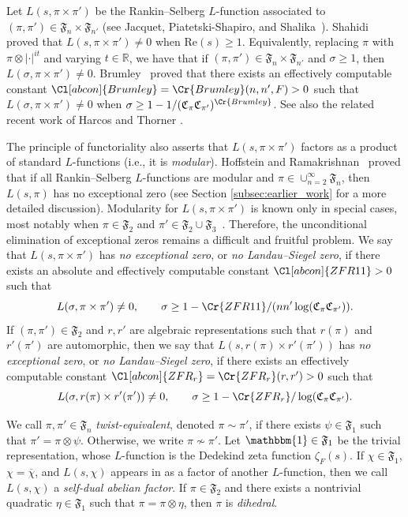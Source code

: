 \documentclass[11pt]{amsart}
\theoremstyle{remark}
\renewcommand{\bar}{\overline}
\numberwithin{equation}{section}
\begin{document}
Let $L(s,\pi\times\pi')$ be the Rankin--Selberg $L$-function associated to $(\pi,\pi')\in\mathfrak{F}_{n}\times\mathfrak{F}_{n'}$ (see Jacquet, Piatetski-Shapiro, and Shalika~\cite{JPSS}).  Shahidi~\cite{Shahidi} proved that $L(s,\pi\times\pi')\neq 0$ when $\mathrm{Re}(s)\geq 1$.  Equivalently, replacing $\pi$ with $\pi\otimes|\cdot|^{it}$ and varying $t\in\mathbb{R}$, we have that if $(\pi,\pi')\in\mathfrak{F}_{n}\times\mathfrak{F}_{n'}$ and $\sigma\geq 1$, then $L(\sigma,\pi\times\pi')\neq 0$.  Brumley~\cite{Brumley,Lapid} proved that there exists an effectively computable constant $\Cl[abcon]{Brumley}=\Cr{Brumley}(n,n',F)>0$ such that $L(\sigma,\pi\times\pi')\neq 0$ when $\sigma\geq 1-1/(\mathfrak{C}_{\pi}\mathfrak{C}_{\pi'})^{\Cr{Brumley}}$.  See also the related recent work of Harcos and Thorner \cite{HarcosThorner,HarcosThorner2}.

The principle of functoriality also asserts that $L(s,\pi\times\pi')$ factors as a product of standard $L$-functions (i.e., it is {\it modular}).  Hoffstein and Ramakrishnan~\cite{HoffsteinRamakrishnan} proved that if all Rankin--Selberg $L$-functions are modular and $\pi \in \cup_{n=2}^{\infty}\mathfrak{F}_{n}$, then $L(s,\pi)$ has no exceptional zero (see Section \ref{subsec:earlier_work} for a more detailed discussion).  Modularity for $L(s,\pi\times\pi')$ is known only in special cases, most notably when $\pi\in\mathfrak{F}_{2}$ and $\pi'\in\mathfrak{F}_{2}\cup\mathfrak{F}_{3}$~\cite{KimShahidi,Ramakrishnan}. Therefore, the unconditional elimination of exceptional zeros remains a difficult and fruitful problem.  We say that $L(s,\pi\times\pi')$ has {\it no exceptional zero}, or {\it no Landau--Siegel zero}, if there exists an absolute and effectively computable constant $\Cl[abcon]{ZFR11}>0$ such that
\[
L(\sigma,\pi\times\pi')\neq 0,\qquad \sigma \geq 1-\Cr{ZFR11}/(n n'\log(\mathfrak{C}_{\pi}\mathfrak{C}_{\pi'})).
\]
If $(\pi,\pi')\in\mathfrak{F}_2$ and $r,r'$ are algebraic representations such that $r(\pi)$ and $r'(\pi')$ are automorphic, then we say that $L(s,r(\pi)\times r'(\pi'))$ has {\it no exceptional zero}, or {\it no Landau--Siegel zero}, if there exists an effectively computable constant $\Cl[abcon]{ZFR_r}=\Cr{ZFR_r}(r,r')>0$ such that
\[
L(\sigma,r(\pi)\times r'(\pi'))\neq 0,\qquad \sigma \geq 1-\Cr{ZFR_r}/\log(\mathfrak{C}_{\pi}\mathfrak{C}_{\pi'}).
\]

We call $\pi,\pi'\in\mathfrak{F}_{n}$ {\it twist-equivalent}, denoted $\pi\sim\pi'$, if there exists $\psi\in\mathfrak{F}_{1}$ such that $\pi'=\pi\otimes\psi$.  Otherwise, we write $\pi\not\sim\pi'$.  Let $\mathbbm{1}\in\mathfrak{F}_{1}$ be the trivial representation, whose $L$-function is the Dedekind zeta function $\zeta_F(s)$.  If $\chi\in\mathfrak{F}_1$, $\chi=\bar{\chi}$, and $L(s,\chi)$ appears in as a factor of another $L$-function, then we call $L(s,\chi)$ a {\it self-dual abelian factor}.  If $\pi\in\mathfrak{F}_2$ and there exists a nontrivial quadratic $\eta\in\mathfrak{F}_1$ such that $\pi = \pi \otimes \eta$, then $\pi$ is \textit{dihedral}.
\end{document}
